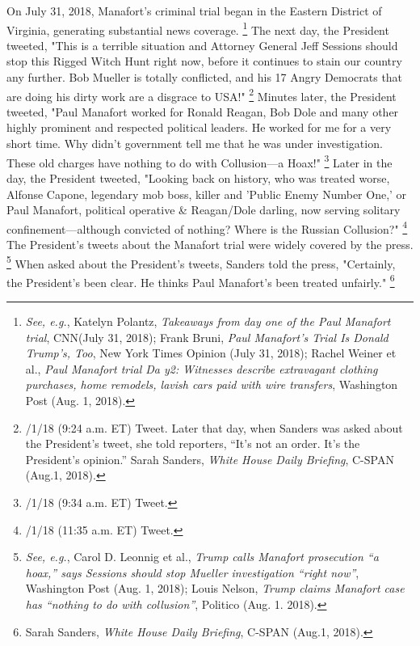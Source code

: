 {On July 31, 2018, Manafort's criminal trial began in the Eastern District of Virginia, generating substantial news coverage.%
\footnote{\textit{See, e.g.}, Katelyn Polantz, \textit{Takeaways from day one of the Paul Manafort trial}, CNN(July 31, 2018);
Frank Bruni, \textit{Paul Manafort’s Trial Is Donald Trump's, Too}, New York Times Opinion (July 31, 2018);
Rachel Weiner et al., \textit{Paul Manafort trial Da y2: Witnesses describe extravagant clothing purchases, home remodels, lavish cars paid with wire transfers}, Washington Post (Aug. 1, 2018).}
The next day, the President tweeted, "This is a terrible situation and Attorney General Jeff Sessions should stop this Rigged Witch Hunt right now, before it continues to stain our country any further.
Bob Mueller is totally conflicted, and his 17 Angry Democrats that are doing his dirty work are a disgrace to USA!"%
\footnote{/1/18 (9:24 a.m. ET) Tweet.
Later that day, when Sanders was asked about the President’s tweet, she told reporters, “It’s not an order.
It’s the President’s opinion.”
Sarah Sanders, \textit{White House Daily Briefing}, C-SPAN (Aug.1, 2018).}
Minutes later, the President tweeted, "Paul Manafort worked for Ronald Reagan, Bob Dole and many other highly prominent and respected political leaders.
He worked for me for a very short time.
Why didn't government tell me that he was under investigation.
These old charges have nothing to do with Collusion—a Hoax!"%
\footnote{/1/18 (9:34 a.m. ET) Tweet.}
Later in the day, the President tweeted, "Looking back on history, who was treated worse, Alfonse Capone, legendary mob boss, killer and 'Public Enemy Number One,' or Paul Manafort, political operative \& Reagan/Dole darling, now serving solitary confinement—although convicted of nothing?
Where is the Russian Collusion?"%
\footnote{/1/18 (11:35 a.m. ET) Tweet.}
The President's tweets about the Manafort trial were widely covered by the press.%
\footnote{\textit{See, e.g.}, Carol D. Leonnig et al., \textit{Trump calls Manafort prosecution “a hoax,” says Sessions should stop Mueller investigation “right now”}, Washington Post (Aug. 1, 2018);
Louis Nelson, \textit{Trump claims Manafort case has “nothing to do with collusion”}, Politico (Aug. 1. 2018).}
When asked about the President's tweets, Sanders told the press, "Certainly, the President's been clear.
He thinks Paul Manafort's been treated unfairly."%
\footnote{Sarah Sanders, \textit{White House Daily Briefing}, C-SPAN (Aug.1, 2018).}

}
